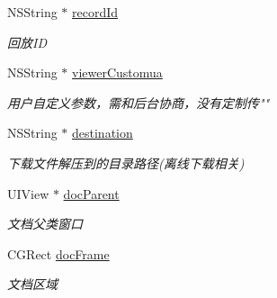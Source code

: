 \begin{DoxyCompactItemize}
\mbox{\label{interface_play_parameter_ac9b41020032b3931a22a01a8e5d80505}} 
N\+S\+String $\ast$ \hyperlink{interface_play_parameter_ac9b41020032b3931a22a01a8e5d80505}{record\+Id}
\begin{DoxyCompactList}\small\item\em 回放\+ID \end{DoxyCompactList}\item 
\mbox{\label{interface_play_parameter_aa7bd8e47d7fb2fe8392fb93084cdcb40}} 
N\+S\+String $\ast$ \hyperlink{interface_play_parameter_aa7bd8e47d7fb2fe8392fb93084cdcb40}{viewer\+Customua}
\begin{DoxyCompactList}\small\item\em 用户自定义参数，需和后台协商，没有定制传"" \end{DoxyCompactList}\item 
\mbox{\label{interface_play_parameter_a47eb893bb06f765300978d0904aa8af0}} 
N\+S\+String $\ast$ \hyperlink{interface_play_parameter_a47eb893bb06f765300978d0904aa8af0}{destination}
\begin{DoxyCompactList}\small\item\em 下载文件解压到的目录路径(离线下载相关) \end{DoxyCompactList}\item 
\mbox{\label{interface_play_parameter_adfbc2b95a74fbbc79ed6dd387bdd0f36}} 
U\+I\+View $\ast$ \hyperlink{interface_play_parameter_adfbc2b95a74fbbc79ed6dd387bdd0f36}{doc\+Parent}
\begin{DoxyCompactList}\small\item\em 文档父类窗口 \end{DoxyCompactList}\item 
\mbox{\label{interface_play_parameter_ad36ae1eaafff8c3be9483521f18052c0}} 
C\+G\+Rect \hyperlink{interface_play_parameter_ad36ae1eaafff8c3be9483521f18052c0}{doc\+Frame}
\begin{DoxyCompactList}\small\item\em 文档区域 \end{DoxyCompactList}\item 
\mbox{\label{interface_play_parameter_a063b2a3b60adced28f74d6890d32d7af}} 

\end{DoxyCompactItemize}

